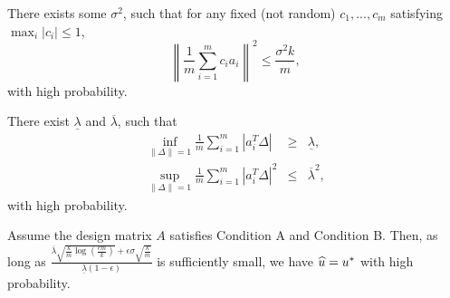 \begin{con0}
There exists some $\sigma^2$, such that for any fixed (not random) $c_1,...,c_m$ satisfying $\max_i|c_i|\leq 1$,
$$\left\|\frac{1}{m}\sum_{i=1}^mc_ia_i\right\|^2\leq \frac{\sigma^2k}{m},$$
with high probability.
\end{con0}
\begin{con2}
There exist $\underline{\lambda}$ and $\overline{\lambda}$, such that
\begin{eqnarray}
\label{eq:l1-upper-A} \inf_{\|\Delta\|=1}\frac{1}{m}\sum_{i=1}^m|a_i^T\Delta| &\geq& \underline{\lambda}, \\
\label{eq:l2-upper-A} \sup_{\|\Delta\|=1}\frac{1}{m}\sum_{i=1}^m|a_i^T\Delta|^2 &\leq& \overline{\lambda}^2,
\end{eqnarray}
with high probability.
\end{con2}
\begin{thm}\label{thm:main-improved}
Assume the design matrix $A$ satisfies Condition A and Condition B. Then, as long as $\frac{\overline{\lambda}\sqrt{\frac{k}{m}\log\left(\frac{em}{k}\right)}+\epsilon\sigma\sqrt{\frac{k}{m}}}{\underline{\lambda}(1-\epsilon)}$ is sufficiently small, we have $\widehat{u}=u^*$ with high probability.
\end{thm}
